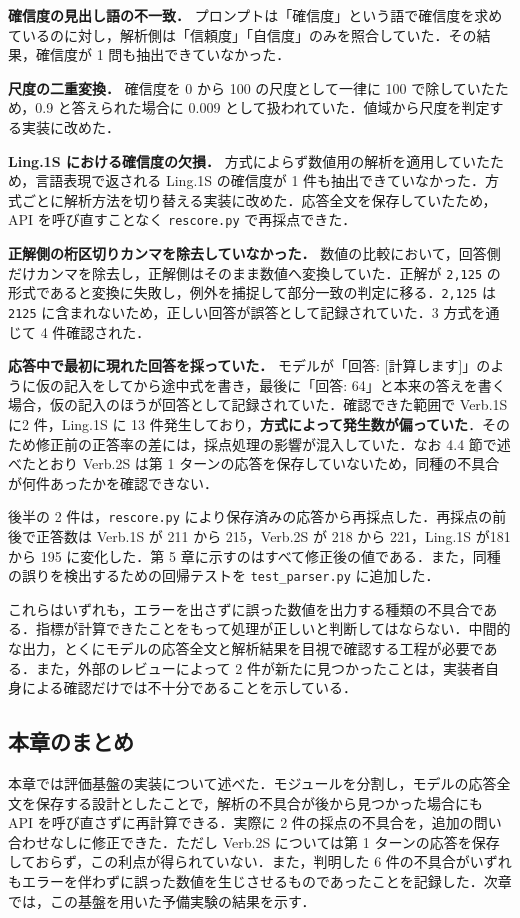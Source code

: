 \textbf{確信度の見出し語の不一致．} プロンプトは「確信度」という語で確信度を求めているのに対し，解析側は「信頼度」「自信度」のみを照合していた．その結果，確信度が 1 問も抽出できていなかった．

\textbf{尺度の二重変換．} 確信度を 0 から 100 の尺度として一律に 100 で除していたため，0.9 と答えられた場合に 0.009 として扱われていた．値域から尺度を判定する実装に改めた．

\textbf{Ling.1S における確信度の欠損．} 方式によらず数値用の解析を適用していたため，言語表現で返される Ling.1S の確信度が 1 件も抽出できていなかった．方式ごとに解析方法を切り替える実装に改めた．応答全文を保存していたため，API を呼び直すことなく \texttt{rescore.\allowbreak{}py} で再採点できた．

\textbf{正解側の桁区切りカンマを除去していなかった．} 数値の比較において，回答側だけカンマを除去し，正解側はそのまま数値へ変換していた．正解が \texttt{2,125} の形式であると変換に失敗し，例外を捕捉して部分一致の判定に移る．\texttt{2,125} は\texttt{2125} に含まれないため，正しい回答が誤答として記録されていた．3 方式を通じて 4 件確認された．

\textbf{応答中で最初に現れた回答を採っていた．} モデルが「回答: [計算します]」のように仮の記入をしてから途中式を書き，最後に「回答: 64」と本来の答えを書く場合，仮の記入のほうが回答として記録されていた．確認できた範囲で Verb.1S に2 件，Ling.1S に 13 件発生しており，\textbf{方式によって発生数が偏っていた}．そのため修正前の正答率の差には，採点処理の影響が混入していた．なお 4.4 節で述べたとおり Verb.2S は第 1 ターンの応答を保存していないため，同種の不具合が何件あったかを確認できない．

後半の 2 件は，\texttt{rescore.\allowbreak{}py} により保存済みの応答から再採点した．再採点の前後で正答数は Verb.1S が 211 から 215，Verb.2S が 218 から 221，Ling.1S が181 から 195 に変化した．第 5 章に示すのはすべて修正後の値である．また，同種の誤りを検出するための回帰テストを \texttt{test\_\allowbreak{}parser.\allowbreak{}py} に追加した．

これらはいずれも，エラーを出さずに誤った数値を出力する種類の不具合である．指標が計算できたことをもって処理が正しいと判断してはならない．中間的な出力，とくにモデルの応答全文と解析結果を目視で確認する工程が必要である．また，外部のレビューによって 2 件が新たに見つかったことは，実装者自身による確認だけでは不十分であることを示している．

\subsection{本章のまとめ}

本章では評価基盤の実装について述べた．モジュールを分割し，モデルの応答全文を保存する設計としたことで，解析の不具合が後から見つかった場合にも API を呼び直さずに再計算できる．実際に 2 件の採点の不具合を，追加の問い合わせなしに修正できた．ただし Verb.2S については第 1 ターンの応答を保存しておらず，この利点が得られていない．また，判明した 6 件の不具合がいずれもエラーを伴わずに誤った数値を生じさせるものであったことを記録した．次章では，この基盤を用いた予備実験の結果を示す．
